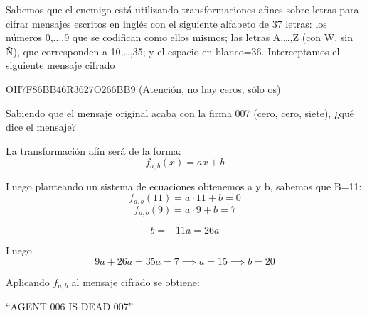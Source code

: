 \begin{problem}[8]
	Sabemos que el enemigo está utilizando transformaciones afines sobre letras para cifrar mensajes escritos en inglés con el siguiente alfabeto de 37 letras: los números 0,...,9 que se codifican como ellos mismos; las letras A,…,Z (con W, sin Ñ), que corresponden a 10,…,35; y el espacio en blanco=36. Interceptamos el siguiente mensaje cifrado

	OH7F86BB46R3627O266BB9 (Atención, no hay ceros, sólo os)

	Sabiendo que el mensaje original acaba con la firma 007 (cero, cero, siete), ¿qué dice el mensaje?

	\solution

	La transformación afín será de la forma:
	\[ f_{a,b}(x) = ax+b \]

	Luego planteando un sistema de ecuaciones obtenemos a y b, sabemos que B=11:
	\[ f_{a,b}(11) = a·11 + b = 0\]
	\[ f_{a,b}(9)  = a·9  + b = 7 \]

	\[ b = -11a = 26a \]

	Luego
	\[ 9a + 26a = 35a = 7 \implies a = 15  \implies b = 20\]

	Aplicando $f_{a,b}$ al mensaje cifrado se obtiene:
	\begin{center}
		``AGENT 006 IS DEAD  007''
	\end{center}
\end{problem}


